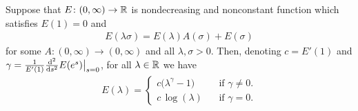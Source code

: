 \begin{lemma}
  \label{lem:solve-E}
  Suppose that $E \colon (0,\infty) \to \mathbb{R}$
  is nondecreasing and nonconstant function which satisfies $E(1) = 0$ and
  \begin{align*}
  E(\lambda \sigma) = E(\lambda) A(\sigma) + E(\sigma)
  \end{align*}
  for some $A \colon (0,\infty) \to (0,\infty)$ and all $\lambda, \sigma > 0$.
  Then, denoting $c = E'(1)$ and $\gamma = \frac{1}{E'(1)} \frac{\mathrm{d}^2}{\mathrm{d} {s}^2} E(e^s) \big|_{s=0}$,
  for all $\lambda \in \mathbb{R}$ we have
  \begin{align*}
  E(\lambda) = \begin{cases}
    c \big( \lambda^\gamma - 1 \big) & \;\;\text{ if $\gamma \ne 0$.} \\
    c \, \log (\lambda) & \;\;\text{ if $\gamma = 0$.}
    \end{cases}
  \end{align*}
\end{lemma}
